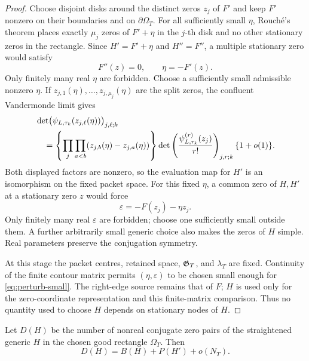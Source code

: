 \begin{proof}
Choose disjoint disks around the distinct zeros $z_j$ of $F'$ and keep $F'$
nonzero on their boundaries and on $\partial\Omega_T$.  For all sufficiently
small $\eta$, Rouch\'e's theorem places exactly $\mu_j$ zeros of $F'+\eta$ in
the $j$-th disk and no other stationary zeros in the rectangle.  Since
$H'=F'+\eta$ and $H''=F''$, a multiple stationary zero would satisfy
\[
F''(z)=0,\qquad \eta=-F'(z).
\]
Only finitely many real $\eta$ are forbidden.  Choose a sufficiently small
admissible nonzero $\eta$.  If
$z_{j,1}(\eta),\dots,z_{j,\mu_j}(\eta)$ are the split zeros, the confluent
Vandermonde limit gives
\begin{align}
&\det\bigl(\psi_{L,\tau_k}(z_{j,\ell}(\eta))\bigr)_{j,\ell;k}\notag\\
&\quad=\left\{\prod_j\prod_{a<b}
 (z_{j,b}(\eta)-z_{j,a}(\eta))\right\}
 \det\left(\frac{\psi_{L,\tau_k}^{(r)}(z_j)}{r!}\right)_{j,r;k}
 \{1+o(1)\}.                                                \label{eq:endgame-confluent}
\end{align}
Both displayed factors are nonzero, so the evaluation map for $H'$ is an
isomorphism on the fixed packet space.  For this fixed $\eta$, a common zero
of $H,H'$ at a stationary zero $z$ would force
\[
\varepsilon=-F(z_j)-\eta z_j.
\]
Only finitely many real $\varepsilon$ are forbidden; choose one sufficiently
small outside them.  A further arbitrarily small generic choice also makes the
zeros of $H$ simple.  Real parameters preserve the conjugation symmetry.

At this stage the packet centres, retained space, $\mathfrak G_T$, and $\lambda_T$
are fixed.  Continuity of the finite contour matrix permits
$(\eta,\varepsilon)$ to be chosen small enough for
\eqref{eq:perturb-small}.  The right-edge source remains that of $F$; $H$ is
used only for the zero-coordinate representation and this finite-matrix
comparison.  Thus no quantity used to choose $H$ depends on stationary nodes
of $H$.
\end{proof}

\begin{lemma}
\label{lem:generic-zero-count}
Let $D(H)$ be the number of nonreal conjugate zero pairs of the straightened
generic $H$ in the chosen good rectangle $\Omega_T$. Then
\begin{equation}
\boxed{D(H)=B(H)+P(H')+o(N_T).}
\label{eq:D-H}
\end{equation}
\end{lemma}

